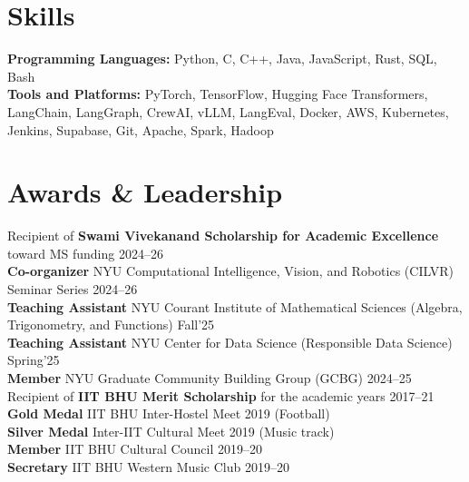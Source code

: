 \documentclass[a4paper,10pt]{article}
\begin{document}
\vspace{-0.1cm}
\section*{Skills}

\textbf{Programming Languages:} Python, C, C++, Java, JavaScript, Rust, SQL, Bash \\
\textbf{Tools and Platforms:} PyTorch, TensorFlow, Hugging Face Transformers, LangChain, LangGraph, CrewAI, vLLM, LangEval, Docker, AWS, Kubernetes, Jenkins, Supabase, Git, Apache, Spark, Hadoop \\
\vspace{-0.4cm}

\section*{Awards \& Leadership}
Recipient of \textbf{Swami Vivekanand Scholarship for Academic Excellence} toward MS funding 2024--26\\
\textbf{Co-organizer} NYU Computational Intelligence, Vision, and Robotics (CILVR) Seminar Series 2024--26 \\
\textbf{Teaching Assistant} NYU Courant Institute of Mathematical Sciences (Algebra, Trigonometry, and Functions) Fall'25\\
\textbf{Teaching Assistant} NYU Center for Data Science (Responsible Data Science) Spring'25\\
\textbf{Member} NYU Graduate Community Building Group (GCBG) 2024--25\\
Recipient of \textbf {IIT BHU Merit Scholarship} for the academic years 2017--21 \\
\textbf{Gold Medal} IIT BHU Inter-Hostel Meet 2019 (Football)\\
\textbf{Silver Medal} Inter-IIT Cultural Meet 2019 (Music track)\\
\textbf{Member} IIT BHU Cultural Council 2019--20\\
\textbf{Secretary} IIT BHU Western Music Club 2019--20\\
\end{document}
